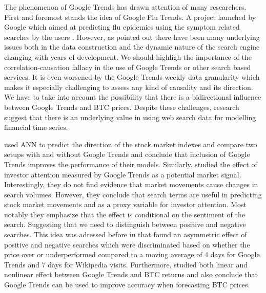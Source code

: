 The phenomenon of Google Trends has drawn attention of many researchers.
First and foremost stands the idea of Google Flu Trends. A project
launched by Google which aimed at predicting flu epidemics using the symptom
related searches by the users \citep{Ginsberg2009}. However, as \cite{Lazer2014}
pointed out there have been many underlying issues both in the data construction
and the dynamic nature of the search engine changing with years of development.
We should highligh the importance of the correlation-causation fallacy in
the use of Google Trends or other search based services. It is even worsened
by the Google Trends weekly data granularity which makes it especially challenging 
to assess any kind of causality and its direction. We have to take into
account the possibility that there is a bidirectional influence 
between Google Trends and \ac{BTC} prices. Despite these challenges, research 
suggest that there is an underlying value in using web search data for modelling
financial time series.



\cite{Hu2018} used \ac{ANN} to predict the direction of the stock market
indexes and compare two setups with and without Google Trends and conclude that 
inclusion of Google Trends improves the performance of their models. Similarly,
\cite{Huang2019} studied the effect of investor attention measured by Google Trends
as a potential market signal. Interestingly, they do not find evidence that
market movements cause changes in search volumes. However, they conclude that
search terms are useful in predicting stock market movements
and as a proxy variable for investor attention. Most notably they emphasize 
that the effect is conditional on the sentiment of the search. Suggesting
that we need to distinguish between positive and negative searches. This idea
was adressed before in \cite{Kristoufek2013} that found an asymmetric effect of 
positive and negative searches which were discriminated based on whether 
the price over or underperformed compared to a moving average of 4 days
for Google Trends and 7 days for Wikipedia visits. Furthermore, \cite{Arratia2021}
studied both linear and nonlinear effect between Google Trends and \ac{BTC} returns
and also conclude that Google Trends can be used to improve accuracy when forecasting
\ac{BTC} prices.





